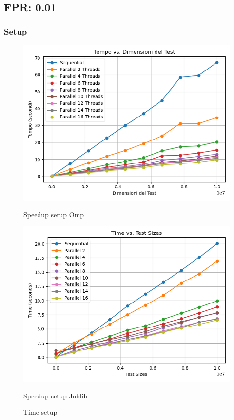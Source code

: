 \documentclass[11pt]{article}
\begin{document}
    \subsection{FPR: 0.01}\label{subsec:fpr-001}
    \subsubsection{Setup}\label{subsubsec:setup}
    \begin{figure}[H]
        \centering
        \includegraphics[width=\linewidth]{omp/001/setup_time_plot}
            \caption{Speedup setup Omp}\label{fig:setup_time_omp}
        \endminipage\hfill
        \includegraphics[width=\linewidth]{joblib/001/setup_time_plot}
            \caption{Speedup setup Joblib}\label{fig:setup_time_joblib}
        \endminipage\hfill
        \caption{Time setup}
    \end{figure}
\end{document}
